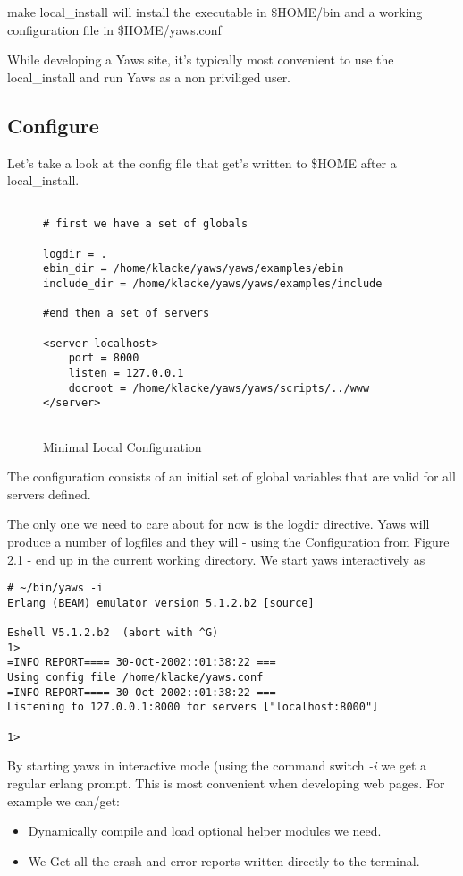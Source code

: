 \documentclass[11pt,oneside,english]{book}
\begin{document}
make local\_install will install the executable in \$HOME/bin and a
working configuration file in \$HOME/yaws.conf

While developing a Yaws site, it's typically most convenient to
use the local\_install and run Yaws as a non priviliged user.


\subsection{Configure}
Let's take a look at the config file that get's written to \$HOME after
a local\_install.


\begin{figure}[h]
\begin{verbatim}

# first we have a set of globals

logdir = .
ebin_dir = /home/klacke/yaws/yaws/examples/ebin
include_dir = /home/klacke/yaws/yaws/examples/include

#end then a set of servers

<server localhost>
	port = 8000
	listen = 127.0.0.1
	docroot = /home/klacke/yaws/yaws/scripts/../www
</server>


\end{verbatim}
\caption{Minimal Local Configuration}
\end{figure}

The configuration consists of an initial set of global
variables that are valid for all servers defined.

The only one we need to care about for now is the logdir
directive. Yaws will produce a number of logfiles and they will -
using the Configuration from Figure 2.1 - end up in the current 
working directory.
We start yaws interactively as 
\begin{verbatim}
# ~/bin/yaws -i
Erlang (BEAM) emulator version 5.1.2.b2 [source]

Eshell V5.1.2.b2  (abort with ^G)
1> 
=INFO REPORT==== 30-Oct-2002::01:38:22 ===
Using config file /home/klacke/yaws.conf
=INFO REPORT==== 30-Oct-2002::01:38:22 ===
Listening to 127.0.0.1:8000 for servers ["localhost:8000"]

1> 
\end{verbatim}

By starting yaws in interactive mode (using the command switch \textit{-i}
we get a regular erlang prompt. This is most convenient when developing
web pages. For example we can/get:
\begin{itemize}
\item{Dynamically compile and load optional helper modules we need.}
\item{We Get all the crash and error reports written directly to the
terminal.}
\end{itemize}
\end{document}
